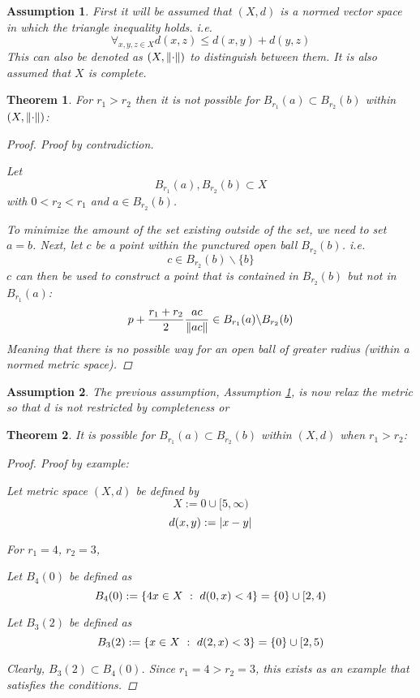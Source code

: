 \documentclass[]{article}
\newcommand{\st}{\ : \ }
\newtheorem{assumption}{Assumption}
\newtheorem{theorem}{Theorem}
\begin{document}
\begin{assumption}\label{ass:normed_metric}
    First it will be assumed that $(X,d)$ is a normed vector space in which the triangle inequality holds. i.e.\[
        \forall_{x,y,z \in X} d(x,z) \leq d(x,y) + d(y,z)
    \]
    This can also be denoted as $(X,\norm{\cdot})$ to distinguish between them.
    It is also assumed that $X$ is complete.
\end{assumption}

\begin{theorem}
    For  $r_1 > r_2$ then it is not possible for $B_{r_1}(a) \subset B_{r_2}(b)$ within $(X, \norm{\cdot})$:
    \begin{proof}
        Proof by contradiction.
        
        Let \[
            B_{r_1}(a), B_{r_2}(b) \subset X
        \]
        with $0 < r_2 < r_1$
        and $a \in B_{r_2}(b)$.

        To minimize the amount of the set existing outside of the set,
        we need to set $a = b$.
        Next, let $c$ be a point within the punctured open ball $B_{r_2}(b)$.
        i.e.\[
            c \in B_{r_2}(b) \backslash \{b\}
        \]
        $c$ can then be used to construct a point that is contained in $B_{r_2}(b)$ but not in $B_{r_1}(a)$:
        \[
            p + \frac{r_1 + r_2}{2} \frac{a c}{\norm{a c}} \in B_{r_1}(a) \backslash B_{r_2}(b)
        \]
        Meaning that there is no possible way for an open ball of greater radius (within a normed metric space).
    \end{proof}
\end{theorem}

\begin{assumption}
    The previous assumption, Assumption \ref{ass:normed_metric}, is now relax the metric so that $d$ is not restricted by completeness or 
\end{assumption}

\begin{theorem}
    It is possible for $B_{r_1}(a) \subset B_{r_2}(b)$ within $(X, d)$ when $r_1 > r_2$:
    \begin{proof}
        Proof by example:

        Let metric space $(X, d)$ be defined by
        \[X := {0} \cup [5, \infty)\]
        \[d(x,y) := \abs{x - y}\]

        For $r_1 = 4$, $r_2 = 3$, 

        Let $B_4(0)$ be defined as
        \[
            B_4(0) := \qty{4
                x \in X \st d(0,x) < 4
            } = \{0\} \cup [2,4)
        \]
        
        Let $B_3(2)$ be defined as
        \[
            B_3(2) := \qty{
                x \in X \st d(2,x) < 3
            } = \{0\} \cup [2, 5)
        \]

        Clearly, $B_3(2) \subset B_4(0)$.
        Since $r_1 = 4 > r_2 = 3$, this exists as an example that satisfies the conditions.
    \end{proof}
\end{theorem}
\end{document}
